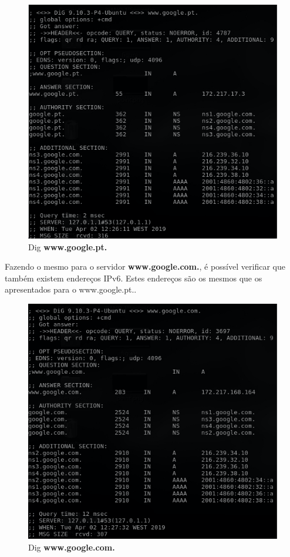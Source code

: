\documentclass{llncs}
\begin{document}
\begin{figure}[H]
\begin{center}
\includegraphics[scale=0.5]{2_1.png}
\end{center}
\caption{\label{fig:1b1}Dig \textbf{www.google.pt.}}
\end{figure}


\newpage

Fazendo o mesmo para o servidor \textbf{www.google.com.}, é possível verificar que também existem endereços IPv6. Estes endereços são os mesmos que os apresentados para o www.google.pt..

\begin{figure}[H]
\begin{center}
\includegraphics[scale=0.5]{2_2.png}
\end{center}
\caption{\label{fig:1b1}Dig \textbf{www.google.com.}}
\end{figure}
\end{document}
